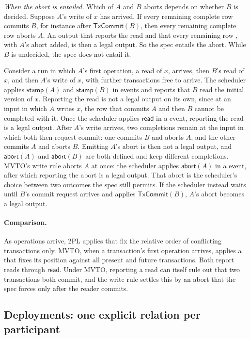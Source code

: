 \emph{When the abort is entailed.}  Which of $A$ and $B$ aborts depends on
whether $B$ is decided.  Suppose $A$'s write of $x$ has arrived.  If every
remaining complete row commits $B$, for instance after $\mathsf{TxCommit}(B)$,
then every remaining complete row aborts $A$.  An output that reports the read
and that every remaining row \outrel, with $A$'s abort added, is then a legal
output.  So the spec entails the abort.  While $B$ is undecided, the spec does
not entail it.

Consider a run in which $A$'s first operation, a read of $x$, arrives, then
$B$'s read of $x$, and then $A$'s write of $x$, with further transactions free
to arrive.  The scheduler applies $\mathsf{stamp}(A)$ and $\mathsf{stamp}(B)$
in \commitment events and reports that $B$ read the initial version of $x$.
Reporting the read is not a legal output on its own, since at an input in
which $A$ writes $x$, the row that commits $A$ and then $B$ cannot be
completed with it.  Once the scheduler applies $\mathsf{read}$ in a
\commitment event, reporting the read is a legal output.  After $A$'s write
arrives, two completions remain at the input in which both then request
commit: one commits $B$ and aborts $A$, and the other commits $A$ and aborts
$B$.  Emitting $A$'s abort is then not a legal output, and
$\mathsf{abort}(A)$ and $\mathsf{abort}(B)$ are both defined and keep
different completions.  MVTO's write rule aborts $A$ at once: the scheduler
applies $\mathsf{abort}(A)$ in a \commitment event, after which reporting the
abort is a legal output.  That abort is the scheduler's choice between two
outcomes the spec still permits.  If the scheduler instead waits until $B$'s
commit request arrives and applies $\mathsf{TxCommit}(B)$, $A$'s abort becomes
a legal output.

\paragraph{Comparison.}
As operations arrive, 2PL applies \commitments that fix the relative order of
conflicting transactions only.  MVTO, when a transaction's first operation
arrives, applies a \commitment that fixes its position against all present and
future transactions.  Both report reads through $\mathsf{read}$.  Under MVTO,
reporting a read can itself rule out that two transactions both commit, and
the write rule settles this by an abort that the spec forces only after the
reader commits.

\subsection{Deployments: one explicit relation per participant}
\label{app:deployment}

